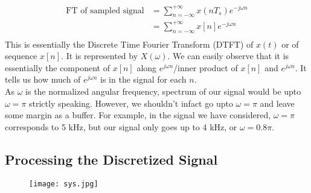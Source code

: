 \begin{align*}
\text{FT of sampled signal}&=\sum\limits_{n=-\infty}^{+\infty} x(nT_s)e^{-j\omega n}\\
&=\sum\limits_{n=-\infty}^{+\infty} x[n]e^{-j\omega n}\\
\end{align*}
This is essentially the Discrete Time Fourier Transform (DTFT) of $x(t)$ or of sequence $x[n]$. It is represented by $X(\omega)$. We can easily observe that it is essentially the component of $x[n]$ along $e^{j\omega n}$/inner product of $x[n]$ and  $e^{j\omega n}$. It tells us how much of $e^{j\omega n}$ is in the signal for each $n$.\\
As $\omega$ is the normalized angular frequency, spectrum of our signal would be upto $\omega=\pi$ strictly speaking. However, we shouldn't infact go upto $\omega=\pi$ and leave some margin as a buffer. For example, in the signal we have considered, $\omega=\pi$ corresponds to 5 kHz, but our signal only goes up to 4 kHz, or $\omega=0.8\pi$.
\subsection{Processing the Discretized Signal}

\begin{figure}[htb]
\centering
\texttt{[image: sys.jpg]}
\caption{}
\end{figure}

